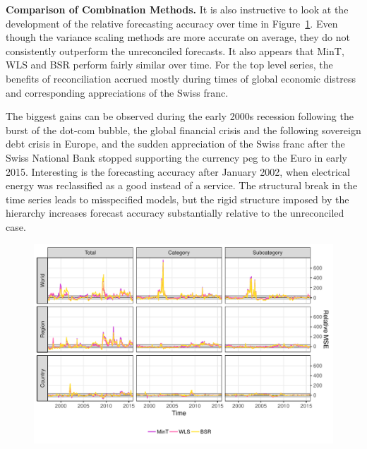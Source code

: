 \documentclass[a4paper,fleqn,11pt]{article}
\begin{document}
\noindent\textbf{Comparison of Combination Methods.} It is also instructive to look at the development of the relative forecasting accuracy over time in Figure~\ref{fig:rmse_time}. Even though the variance scaling methods are more accurate on average, they do not consistently outperform the unreconciled forecasts. It also appears that MinT, WLS and BSR perform fairly similar over time. For the top level series, the benefits of reconciliation accrued mostly during times of global economic distress and corresponding appreciations of the Swiss franc.

The biggest gains can be observed during the early 2000s recession following the burst of the dot-com bubble, the global financial crisis and the following sovereign debt crisis in Europe, and the sudden appreciation of the Swiss franc after the Swiss National Bank stopped supporting the currency peg to the Euro in early 2015. Interesting is the forecasting accuracy after January 2002, when electrical energy was reclassified as a good instead of a service. The structural break in the time series leads to misspecified models, but the rigid structure imposed by the hierarchy increases forecast accuracy substantially relative to the unreconciled case.

\begin{figure}[H]
	\includegraphics[width=\textwidth]{fig/fig_eval_rmse_time}
	\label{fig:rmse_time}
\end{figure}
\end{document}
